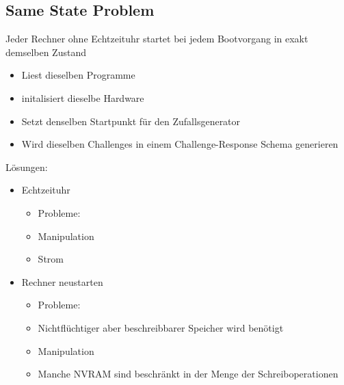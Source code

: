 \documentclass{article} %
\begin{document}
\subsection{Same State Problem}
Jeder Rechner ohne Echtzeituhr startet bei jedem Bootvorgang in exakt demselben Zustand
\begin{itemize}
	\item Liest dieselben Programme
    \item initalisiert dieselbe Hardware
    \item Setzt denselben Startpunkt für den Zufallsgenerator
    \item Wird dieselben Challenges in einem Challenge-Response Schema generieren
\end{itemize}
Lösungen:
\begin{itemize}
	\item Echtzeituhr
    
    \begin{itemize}
        \item Probleme:
        \item Manipulation
        \item Strom
    \end{itemize}
    \item Rechner neustarten
    
    \begin{itemize}
        \item Probleme:
        \item Nichtflüchtiger aber beschreibbarer Speicher wird benötigt
        \item Manipulation
        \item Manche NVRAM sind beschränkt in der Menge der Schreiboperationen
    \end{itemize}
\end{itemize}
\end{document}
